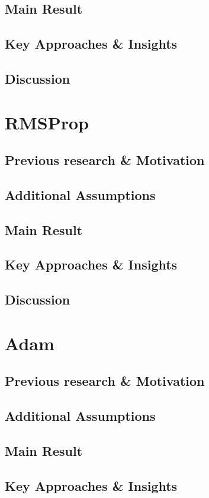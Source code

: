 \documentclass{article}
\begin{document}
\subsection{Main Result}
\subsection{Key Approaches \& Insights}
\subsection{Discussion}
\newpage
\section{RMSProp}
\label{section6}
\subsection{Previous research \& Motivation}
\subsection{Additional Assumptions}
\subsection{Main Result}
\subsection{Key Approaches \& Insights}
\subsection{Discussion}
\newpage
\section{Adam}
\label{section7}
\subsection{Previous research \& Motivation}
\subsection{Additional Assumptions}
\subsection{Main Result}
\subsection{Key Approaches \& Insights}
\end{document}
